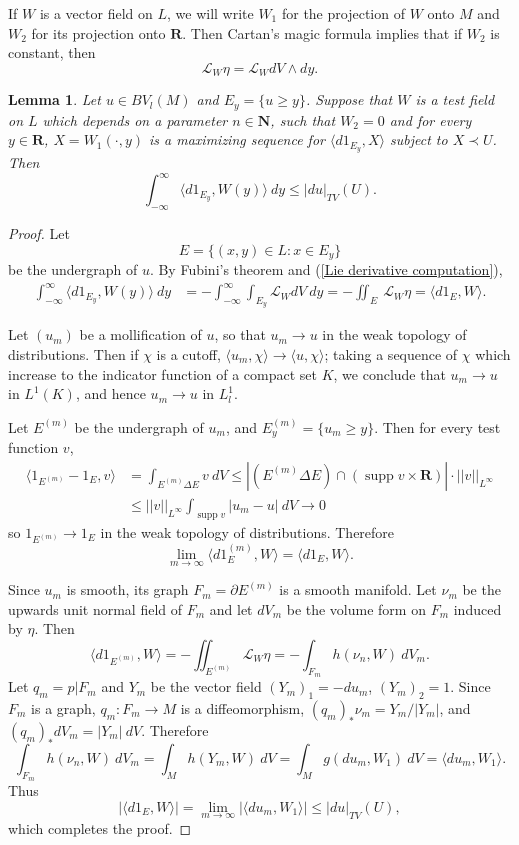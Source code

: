 \documentclass[reqno,12pt,letterpaper]{amsart}
\newcommand{\NN}{\mathbf{N}}
\newcommand{\RR}{\mathbf{R}}
\DeclareMathOperator{\supp}{supp}
\newtheorem{lemma}[theorem]{Lemma}
\theoremstyle{definition}
\numberwithin{equation}{section}
\begin{document}
If $W$ is a vector field on $L$, we will write $W_1$ for the projection of $W$ onto $M$ and $W_2$ for its projection onto $\RR$.
Then Cartan's magic formula implies that if $W_2$ is constant, then
\begin{equation}
\label{Lie derivative computation}
\mathcal L_W\eta = \mathcal L_WdV \wedge dy.
\end{equation}

\begin{lemma}\label{coarea converse}
Let $u \in BV_l(M)$ and $E_y = \{u \geq y\}$.
Suppose that $W$ is a test field on $L$ which depends on a parameter $n \in \NN$, such that $W_2 = 0$ and for every $y \in \RR$, $X = W_1(\cdot, y)$ is a maximizing sequence for $\langle d 1_{E_y}, X\rangle$ subject to $X \prec U$.
Then
$$\int_{-\infty}^\infty \langle d 1_{E_y}, W(y)\rangle ~dy \leq |d u|_{TV}(U).$$
\end{lemma}
\begin{proof}
Let
$$E = \{(x, y) \in L: x \in E_y\}$$
be the undergraph of $u$.
By Fubini's theorem and (\ref{Lie derivative computation}),
\begin{align*}
\int_{-\infty}^\infty \langle d 1_{E_y}, W(y)\rangle ~dy &= -\int_{-\infty}^\infty \int_{E_y} \mathcal L_WdV ~dy = -\iint_E ~\mathcal L_W\eta = \langle d 1_E, W\rangle.
\end{align*}

Let $(u_m)$ be a mollification of $u$, so that $u_m \to u$ in the weak topology of distributions.
Then if $\chi$ is a cutoff, $\langle u_m, \chi\rangle \to \langle u, \chi\rangle$; taking a sequence of $\chi$ which increase to the indicator function of a compact set $K$, we conclude that $u_m \to u$ in $L^1(K)$, and hence $u_m \to u$ in $L^1_l$.

Let $E^{(m)}$ be the undergraph of $u_m$, and $E^{(m)}_y = \{u_m \geq y\}$.
Then for every test function $v$,
\begin{align*}
\langle 1_{E^{(m)}} - 1_E, v\rangle &= \int_{E^{(m)} \Delta E} v ~dV \leq |(E^{(m)} \Delta E) \cap (\supp v \times \RR)| \cdot ||v||_{L^\infty}\\
&\leq ||v||_{L^\infty} \int_{\supp v} |u_m - u| ~dV \to 0
\end{align*}
so $1_{E^{(m)}} \to 1_E$ in the weak topology of distributions.
Therefore
$$\lim_{m \to \infty} \langle d 1_E^{(m)}, W\rangle = \langle d 1_E, W\rangle.$$

Since $u_m$ is smooth, its graph $F_m = \partial E^{(m)}$ is a smooth manifold.
Let $\nu_m$ be the upwards unit normal field of $F_m$ and let $dV_m$ be the volume form on $F_m$ induced by $\eta$.
Then
$$\langle d 1_{E^{(m)}}, W\rangle = -\iint_{E^{(m)}} \mathcal L_W\eta = -\int_{F_m} h(\nu_n, W) ~dV_m.$$
Let $q_m = p|F_m$ and $Y_m$ be the vector field $(Y_m)_1 = -d u_m$, $(Y_m)_2 = 1$.
Since $F_m$ is a graph, $q_m: F_m \to M$ is a diffeomorphism, $(q_m)_*\nu_m = Y_m/|Y_m|$, and $(q_m)_*dV_m = |Y_m|~dV$. Therefore
$$\int_{F_m} h(\nu_n, W) ~dV_m = \int_M h(Y_m, W) ~dV = \int_M g(d u_m, W_1) ~dV = \langle d u_m, W_1\rangle.$$
Thus
$$|\langle d 1_E, W\rangle| = \lim_{m \to \infty} |\langle d u_m, W_1\rangle| \leq |d u|_{TV}(U),$$
which completes the proof.
\end{proof}
\end{document}
